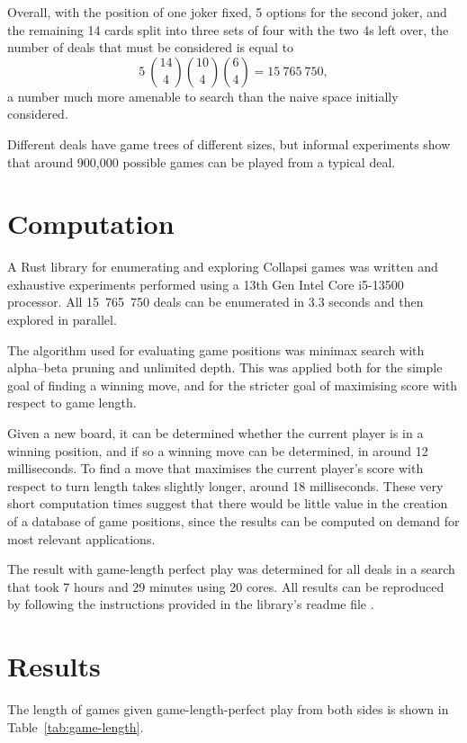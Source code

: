 \documentclass[a4paper, twocolumn]{article}
\begin{document}
Overall, with the position of one joker fixed, 5 options for the second joker,
and the remaining 14 cards split into three sets of four with the two 4s left
over, the number of deals that must be considered is equal to
$$5~\binom{14}{4} \binom{10}{4} \binom{6}{4} = 15~765~750,$$
a number much more amenable to search than the naive space initially considered.

Different deals have game trees of different sizes, but informal experiments
show that around 900,000 possible games can be played from a typical deal.


\section{Computation}

A Rust library for enumerating and exploring Collapsi games was written
\cite{github} and exhaustive experiments performed using a 13th Gen Intel Core
i5-13500 processor. All 15~765~750 deals can be enumerated in 3.3 seconds and
then explored in parallel.

The algorithm used for evaluating game positions was minimax search with
alpha--beta pruning and unlimited depth. This was applied both for the simple
goal of finding a winning move, and for the stricter goal of maximising score
with respect to game length.

Given a new board, it can be determined whether the current player is in a
winning position, and if so a winning move can be determined, in around 12
milliseconds. To find a move that maximises the current player's score with
respect to turn length takes slightly longer, around 18 milliseconds. These very
short computation times suggest that there would be little value in the creation
of a database of game positions, since the results can be computed on demand for
most relevant applications.

The result with game-length perfect play was determined for all deals in a
search that took 7 hours and 29 minutes using 20 cores. All results can be
reproduced by following the instructions provided in the library's readme file
\cite{github}.


\section{Results}

The length of games given game-length-perfect play from both sides is shown in
Table~\ref{tab:game-length}.
\end{document}
